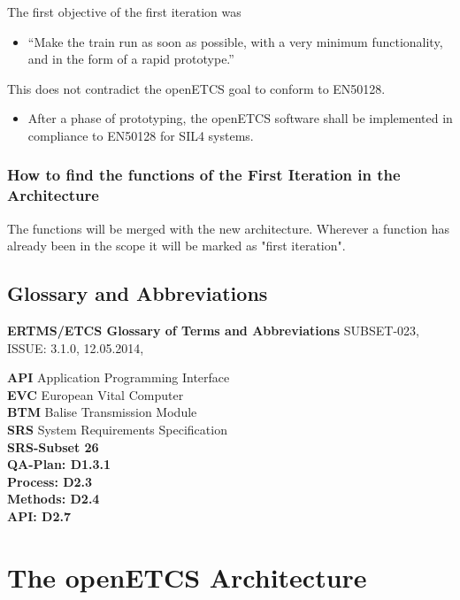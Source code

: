 \documentclass{template/openetcs_report}
\begin{document}
The first objective of the first iteration was
\begin{itemize}
	\item ``Make the train run as soon as possible, with a very minimum functionality, and in the form of a rapid prototype.''
\end{itemize}
This does not contradict the openETCS goal to conform to EN50128.
\begin{itemize}
	\item After a phase of prototyping, the openETCS software shall be implemented in compliance to EN50128 for SIL4 systems.
\end{itemize}

\subsection{How to find the functions of the First Iteration in the Architecture}
The functions will be merged with the new architecture. Wherever a function has already been in the scope it will be marked as "first iteration".

\section{Glossary and Abbreviations}
\textbf{ERTMS/ETCS Glossary of Terms and Abbreviations} SUBSET-023, ISSUE: 3.1.0, 12.05.2014,

\textbf{API} Application Programming Interface\\
\textbf{EVC} European Vital Computer\\
\textbf{BTM} Balise Transmission Module\\
\textbf{SRS} System Requirements Specification\\


\textbf{SRS-Subset 26}\\
\textbf{QA-Plan: D1.3.1}\\
\textbf{Process: D2.3}\\
\textbf{Methods: D2.4}\\
\textbf{API: D2.7}\\

\chapter{The openETCS Architecture}
\end{document}

